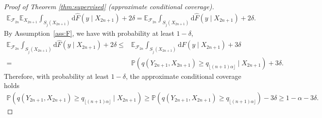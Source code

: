 \begin{proof}[Proof of Theorem \ref{thm:supervised} (approximate conditional coverage)]
\begin{align*}
\mathbb{E}_{\mathcal{F}_{2n}}\mathbb{E}_{X_{2n+1}}\int_{S_{\widehat{j}}(X_{2n+1})} \mathrm{d}\widehat{F}(y \mid X_{2n+1}) + 2\delta 
=\mathbb{E}_{\mathcal{F}_{2n}}\int_{S_{\widehat{j}}(X_{2n+1})} \mathrm{d}\widehat{F}(y \mid X_{2n+1}) + 2\delta.
\end{align*}
By Assumption~\ref{ass:F}, we have with probability at least $1-\delta$,
\begin{align*}
\mathbb{E}_{\mathcal{F}_{2n}}\int_{S_{\widehat{j}}(X_{2n+1})} \mathrm{d}\widehat{F}(y \mid X_{2n+1}) + 2\delta 
\leq& \mathbb{E}_{\mathcal{F}_{2n}}\int_{S_{\widehat{j}}(X_{2n+1})} \mathrm{d}F(y \mid X_{2n+1}) +3\delta \\
=& \mathbb{P}\left(q(Y_{2n+1},X_{2n+1})\geq q_{\lfloor(n+1)\alpha\rfloor} \mid X_{2n+1}\right) + 3\delta.
\end{align*}
Therefore, with probability at least $1-\delta$, the approximate conditional coverage holds
\begin{align*}
\mathbb{P}\left(q(Y_{2n+1},X_{2n+1})\geq q_{\lfloor(n+1)\alpha\rfloor} \mid X_{2n+1}\right) 
\geq \mathbb{P}\left(q(Y_{2n+1},X_{2n+1})\geq q_{\lfloor(n+1)\alpha\rfloor}\right) - 3\delta \geq 1-\alpha -3\delta.
\end{align*}
\end{proof}

